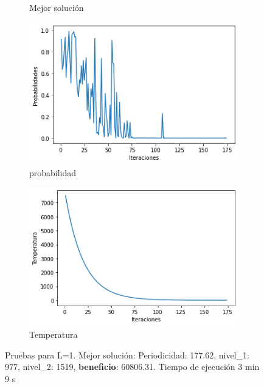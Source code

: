\documentclass[a4paper,12pt]{article}
\begin{document}
\begin{figure}[H]
\begin{subfigure}{0.24\textwidth}
			\caption{Mejor solución}
		\end{subfigure}
		\hfill
		\begin{subfigure}{0.24\textwidth}
			\centering
			\includegraphics[width=\textwidth]{include/L1/probabilidades.png}
			\caption{probabilidad}
		\end{subfigure}
		\hfill
		\begin{subfigure}{0.24\textwidth}
			\centering
			\includegraphics[width=\textwidth]{include/L1/temperatura.png}
			\caption{Temperatura}
		\end{subfigure}
		\caption{Pruebas para L=1. Mejor solución: Periodicidad: 177.62, nivel_1: 977, nivel_2: 1519, \textbf{beneficio}: 60806.31. Tiempo de ejecución 3 min 9 s }
	\end{figure}
\end{document}
